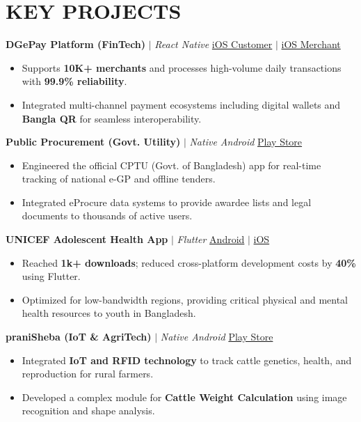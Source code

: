 \documentclass[10pt,a4paper]{article}
\begin{document}
\section*{KEY PROJECTS}

\textbf{DGePay Platform (FinTech)} $|$ \textit{React Native} \hfill \href{https://apps.apple.com/us/app/dgepay-bekti/id6456410767}{iOS Customer} $|$ \href{https://apps.apple.com/us/app/dgepay-saudagor/id6456410810}{iOS Merchant}
\begin{itemize}
    \item Supports \textbf{10K+ merchants} and processes high-volume daily transactions with \textbf{99.9\% reliability}.
    \item Integrated multi-channel payment ecosystems including digital wallets and \textbf{Bangla QR} for seamless interoperability.
\end{itemize}

\vspace{4pt}

\textbf{Public Procurement (Govt. Utility)} $|$ \textit{Native Android} \hfill \href{https://play.google.com/store/apps/details?id=com.cptu}{Play Store}
\begin{itemize}
    \item Engineered the official CPTU (Govt. of Bangladesh) app for real-time tracking of national e-GP and offline tenders.
    \item Integrated eProcure data systems to provide awardee lists and legal documents to thousands of active users.
\end{itemize}

\vspace{4pt}

\textbf{UNICEF Adolescent Health App} $|$ \textit{Flutter} \hfill \href{https://play.google.com/store/apps/details?id=com.dnet.unice.adolescent}{Android} $|$ \href{https://apps.apple.com/us/app/adolescent-health/id1569604494}{iOS}
\begin{itemize}
    \item Reached \textbf{1k+ downloads}; reduced cross-platform development costs by \textbf{40\%} using Flutter.
    \item Optimized for low-bandwidth regions, providing critical physical and mental health resources to youth in Bangladesh.
\end{itemize}

\vspace{4pt}

\textbf{praniSheba (IoT \& AgriTech)} $|$ \textit{Native Android} \hfill \href{https://play.google.com/store/apps/details?id=com.sm.cattleshurjohms}{Play Store}
\begin{itemize}
    \item Integrated \textbf{IoT and RFID technology} to track cattle genetics, health, and reproduction for rural farmers.
    \item Developed a complex module for \textbf{Cattle Weight Calculation} using image recognition and shape analysis.
\end{itemize}
\end{document}
